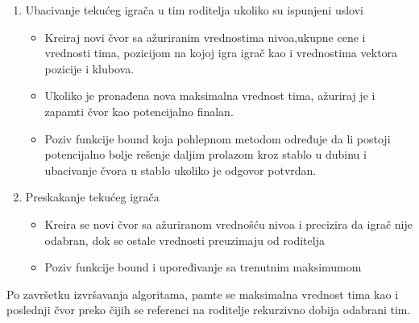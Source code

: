 \documentclass[a4paper]{article}
\begin{document}
\begin{enumerate}
  \item Ubacivanje tekućeg igrača u tim roditelja ukoliko su ispunjeni uslovi 
  \vspace{1mm}
  \begin{itemize}
	\item Kreiraj novi čvor sa ažuriranim vrednostima nivoa,ukupne cene i vrednosti tima, pozicijom na kojoj igra igrač kao i vrednostima vektora pozicije i klubova.  
	\vspace{1mm}
	\item Ukoliko je pronađena nova maksimalna vrednost tima, ažuriraj je i zapamti čvor kao potencijalno finalan.
	\vspace{1mm}
	\item Poziv funkcije bound koja pohlepnom metodom određuje da li postoji potencijalno bolje rešenje daljim prolazom kroz stablo u dubinu i ubacivanje čvora u stablo ukoliko je odgovor potvrdan.
	
  \end{itemize}
  \vspace{1mm}
  \item Preskakanje tekućeg igrača 
  \vspace{1mm}
  \begin{itemize}
	\item Kreira se novi čvor sa ažuriranom vrednošću nivoa i precizira da igrač nije odabran, dok se ostale vrednosti preuzimaju od roditelja
	\vspace{1mm}
	\item Poziv funkcije bound i upoređivanje sa trenutnim maksimumom
	
  \end{itemize}
\end{enumerate} 
\vspace{3mm} 

Po završetku izvršavanja algoritama, pamte se maksimalna vrednost tima kao i poslednji čvor preko čijih se referenci na roditelje rekurzivno dobija odabrani tim.


\end{document}
